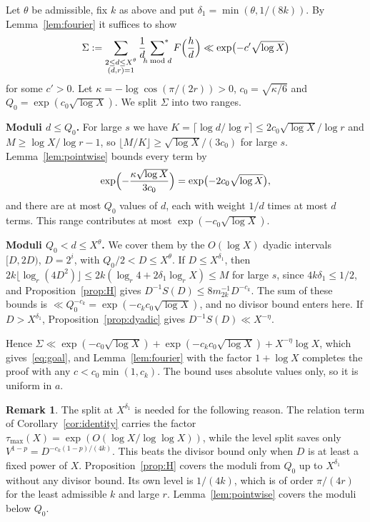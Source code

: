 \documentclass[11pt]{amsart}
\makeatletter
\theoremstyle{definition}
\newtheorem{remark}[theorem]{Remark}
\numberwithin{equation}{section}
\renewenvironment{proof}[1][\proofname]{\par\pushQED{\qed}\normalfont\topsep6\p@\@plus6\p@\relax\trivlist\item[\hskip\labelsep\upshape#1.]\ignorespaces}{\popQED\endtrivlist\@endpefalse}
\newcommand{\sumstar}{\sideset{}{^*}\sum}
\newcommand{\tmax}{\tau_{\max}}
\makeatother
\begin{document}
\begin{proof}[Proof of Theorem~\ref{thm:level}]
Let $\theta$ be admissible, fix $k$ as above and put $\delta_1=\min(\theta,1/(8k))$. By Lemma~\ref{lem:fourier} it suffices to show
\begin{equation}\label{eq:goal}
\Sigma:=\sum_{\substack{2\le d\le X^{\theta}\\(d,r)=1}}\frac1d\sumstar_{h\bmod d}F\Bigl(\frac hd\Bigr)\ll\exp\bigl(-c'\sqrt{\log X}\bigr)
\end{equation}
for some $c'>0$. Let $\kappa=-\log\cos(\pi/(2r))>0$, $c_0=\sqrt{\kappa/6}$ and $Q_0=\exp(c_0\sqrt{\log X})$. We split $\Sigma$ into two ranges.

\textbf{Moduli $d\le Q_0$.} For large $s$ we have $K=\lceil\log d/\log r\rceil\le2c_0\sqrt{\log X}/\log r$ and $M\ge\log X/\log r-1$, so $\lfloor M/K\rfloor\ge\sqrt{\log X}/(3c_0)$ for large $s$. Lemma~\ref{lem:pointwise} bounds every term by
\[
\exp\Bigl(-\frac{\kappa\sqrt{\log X}}{3c_0}\Bigr)=\exp\bigl(-2c_0\sqrt{\log X}\bigr),
\]
and there are at most $Q_0$ values of $d$, each with weight $1/d$ times at most $d$ terms. This range contributes at most $\exp(-c_0\sqrt{\log X})$.

\textbf{Moduli $Q_0<d\le X^{\theta}$.} We cover them by the $O(\log X)$ dyadic intervals $[D,2D)$, $D=2^i$, with $Q_0/2<D\le X^{\theta}$. If $D\le X^{\delta_1}$, then $2k\lfloor\log_r(4D^2)\rfloor\le2k(\log_r4+2\delta_1\log_rX)\le M$ for large $s$, since $4k\delta_1\le1/2$, and Proposition~\ref{prop:H} gives $D^{-1}S(D)\le8m_{2k}^{-1}D^{-c_k}$. The sum of these bounds is $\ll Q_0^{-c_k}=\exp(-c_kc_0\sqrt{\log X})$, and no divisor bound enters here. If $D>X^{\delta_1}$, Proposition~\ref{prop:dyadic} gives $D^{-1}S(D)\ll X^{-\eta}$.

Hence $\Sigma\ll\exp(-c_0\sqrt{\log X})+\exp(-c_kc_0\sqrt{\log X})+X^{-\eta}\log X$, which gives~\eqref{eq:goal}, and Lemma~\ref{lem:fourier} with the factor $1+\log X$ completes the proof with any $c<c_0\min(1,c_k)$. The bound uses absolute values only, so it is uniform in $a$.
\end{proof}

\begin{remark}\label{rem:range}
The split at $X^{\delta_1}$ is needed for the following reason. The relation term of Corollary~\ref{cor:identity} carries the factor $\tmax(X)=\exp(O(\log X/\log\log X))$, while the level split saves only $V^{1-p}=D^{-c_k(1-p)/(4k)}$. This beats the divisor bound only when $D$ is at least a fixed power of $X$. Proposition~\ref{prop:H} covers the moduli from $Q_0$ up to $X^{\delta_1}$ without any divisor bound. Its own level is $1/(4k)$, which is of order $\pi/(4r)$ for the least admissible $k$ and large $r$. Lemma~\ref{lem:pointwise} covers the moduli below $Q_0$.
\end{remark}
\end{document}
